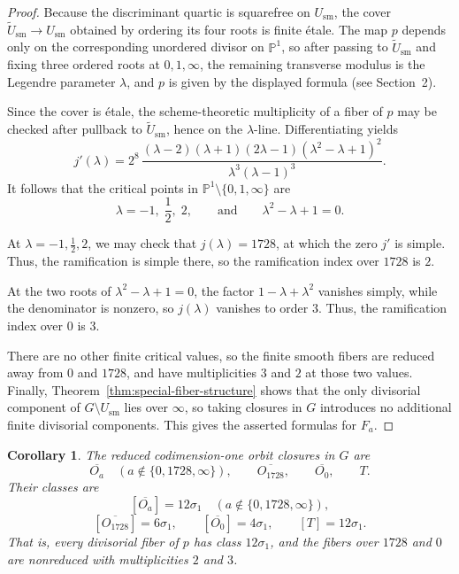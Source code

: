 \documentclass[11pt]{article}
\newtheorem{corollary}[theorem]{Corollary}
\newcommand{\Pj}{\mathbb P}
\begin{document}
\begin{proof}
Because the discriminant quartic is squarefree on $U_{\mathrm{sm}}$, the cover
$\widetilde U_{\mathrm{sm}}\to U_{\mathrm{sm}}$ obtained by ordering its four roots is finite
\'etale. The map $p$ depends only on the corresponding unordered divisor on $\Pj^1$,
so after passing to $\widetilde U_{\mathrm{sm}}$ and fixing three ordered roots at
$0,1,\infty$, the remaining transverse modulus is the Legendre parameter $\lambda$, and
$p$ is given by the displayed formula (see Section~2).

Since the cover is \'etale, the scheme-theoretic multiplicity of a fiber of $p$ may be checked
after pullback to $\widetilde U_{\mathrm{sm}}$, hence on the $\lambda$-line. Differentiating yields
\[
j'(\lambda)=
2^8\,
\frac{(\lambda-2)(\lambda+1)(2\lambda-1)(\lambda^2-\lambda+1)^2}
{\lambda^3(\lambda-1)^3}.
\]
It follows that the critical points in $\Pj^1\setminus\{0,1,\infty\}$ are
\[
\lambda=-1,\;\frac12,\;2,
\qquad\text{and}\qquad
\lambda^2-\lambda+1=0.
\]

At $\lambda=-1,\frac12,2$, we may check that $j(\lambda)=1728$, at which the zero $j'$ is simple. Thus, the ramification is simple there, so the ramification index over $1728$ is $2$.

At the two roots of $\lambda^2-\lambda+1=0$, the factor $1-\lambda+\lambda^2$ vanishes simply, while the denominator is nonzero, so $j(\lambda)$ vanishes to order $3$. Thus, the ramification index over $0$ is $3$.

There are no other finite critical values, so the finite smooth fibers are reduced away from
$0$ and $1728$, and have multiplicities $3$ and $2$ at those two values. Finally,
Theorem~\ref{thm:special-fiber-structure} shows that the only divisorial component of $G\setminus U_{\mathrm{sm}}$
lies over $\infty$, so taking closures in $G$ introduces no additional finite divisorial
components. This gives the asserted formulas for $F_a$.
\end{proof}

\begin{corollary}\label{cor:reduced-orbit-closure-classes}
The reduced codimension-one orbit closures in $G$ are
\[
\overline{O_a}\quad (a\notin\{0,1728,\infty\}),\qquad
\overline{O_{1728}},\qquad
\overline{O_0},\qquad
T.
\]
Their classes are
\[
[\overline{O_a}] = 12\sigma_1
\quad (a\notin\{0,1728,\infty\}),
\]
\[
[\overline{O_{1728}}] = 6\sigma_1,
\qquad
[\overline{O_0}] = 4\sigma_1,
\qquad
[T] = 12\sigma_1.
\]
That is, every divisorial fiber of $p$ has class $12\sigma_1$,
and the fibers over $1728$ and $0$ are nonreduced with multiplicities $2$ and $3$.
\end{corollary}
\end{document}
